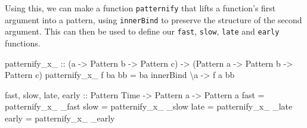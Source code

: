 \documentclass[
]{article}
\newenvironment{Shaded}{}{}
\newcommand{\DataTypeTok}[1]{\textcolor[rgb]{0.56,0.13,0.00}{#1}}
\newcommand{\FunctionTok}[1]{\textcolor[rgb]{0.02,0.16,0.49}{#1}}
\newcommand{\KeywordTok}[1]{\textcolor[rgb]{0.00,0.44,0.13}{\textbf{#1}}}
\newcommand{\NormalTok}[1]{#1}
\newcommand{\OperatorTok}[1]{\textcolor[rgb]{0.40,0.40,0.40}{#1}}
\newcommand{\OtherTok}[1]{\textcolor[rgb]{0.00,0.44,0.13}{#1}}
\newcommand{\StringTok}[1]{\textcolor[rgb]{0.25,0.44,0.63}{#1}}
\begin{document}
\begin{Shaded}
\end{Shaded}

Using this, we can make a function \texttt{patternify} that lifts a
function's first argument into a pattern, using \texttt{innerBind} to
preserve the structure of the second argument. This can then be used to
define our \texttt{fast}, \texttt{slow}, \texttt{late} and
\texttt{early} functions.

\begin{Shaded}
\begin{Highlighting}[]
\OtherTok{patternify\_x\_ ::}\NormalTok{ (a }\OtherTok{{-}\textgreater{}} \DataTypeTok{Pattern}\NormalTok{ b }\OtherTok{{-}\textgreater{}} \DataTypeTok{Pattern}\NormalTok{ c) }\OtherTok{{-}\textgreater{}}\NormalTok{ (}\DataTypeTok{Pattern}\NormalTok{ a }\OtherTok{{-}\textgreater{}} \DataTypeTok{Pattern}\NormalTok{ b }\OtherTok{{-}\textgreater{}} \DataTypeTok{Pattern}\NormalTok{ c)}
\NormalTok{patternify\_x\_ f ba bb }\OtherTok{=}\NormalTok{ ba }\OtherTok{\textasciigrave{}innerBind\textasciigrave{}}\NormalTok{ \textbackslash{}a }\OtherTok{{-}\textgreater{}}\NormalTok{ f a bb}

\NormalTok{fast, slow, late,}\OtherTok{ early ::} \DataTypeTok{Pattern} \DataTypeTok{Time} \OtherTok{{-}\textgreater{}} \DataTypeTok{Pattern}\NormalTok{ a }\OtherTok{{-}\textgreater{}} \DataTypeTok{Pattern}\NormalTok{ a}
\NormalTok{fast }\OtherTok{=}\NormalTok{ patternify\_x\_ \_fast}
\NormalTok{slow }\OtherTok{=}\NormalTok{ patternify\_x\_ \_slow}
\NormalTok{late }\OtherTok{=}\NormalTok{ patternify\_x\_ \_late}
\NormalTok{early }\OtherTok{=}\NormalTok{ patternify\_x\_ \_early}
\end{Highlighting}
\end{Shaded}
\end{document}
